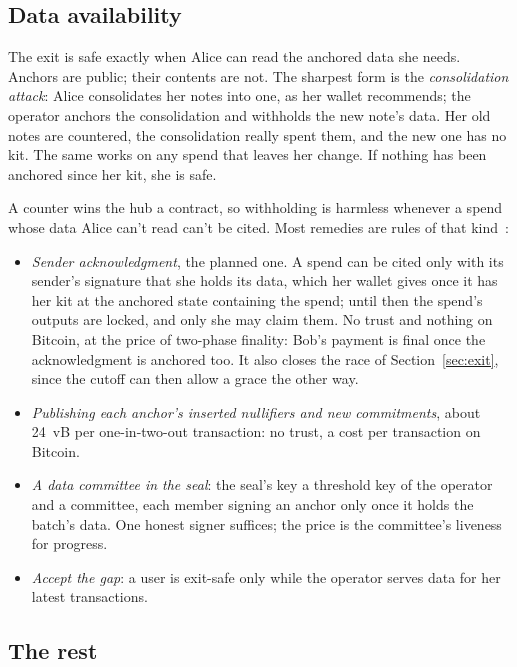 \documentclass[11pt]{article}
\begin{document}
\subsection{Data availability}
\label{sec:da}

The exit is safe exactly when Alice can read the anchored data she
needs. Anchors are public; their contents are not. The sharpest form is
the \emph{consolidation attack}: Alice consolidates her notes into one,
as her wallet recommends; the operator anchors the consolidation and
withholds the new note's data. Her old notes are countered, the
consolidation really spent them, and the new one has no kit. The same
works on any spend that leaves her change. If nothing has been anchored
since her kit, she is safe.

A counter wins the hub a contract, so withholding is harmless whenever a
spend whose data Alice can't read can't be cited. Most remedies are
rules of that kind~\cite{bitcoinrollups}:
\begin{itemize}[leftmargin=1.5em]
\item \emph{Sender acknowledgment}, the planned one. A spend can be cited
  only with its sender's signature that she holds its data, which her
  wallet gives once it has her kit at the anchored state containing the
  spend; until then the spend's outputs are locked, and only she may
  claim them. No trust and nothing on Bitcoin, at the price of
  two-phase finality: Bob's payment is final once the acknowledgment is
  anchored too. It also closes the race of Section~\ref{sec:exit}, since
  the cutoff can then allow a grace the other way.
\item \emph{Publishing each anchor's inserted nullifiers and new
  commitments}, about 24~vB per one-in-two-out transaction: no trust,
  a cost per transaction on Bitcoin.
\item \emph{A data committee in the seal}: the seal's key a threshold key
  of the operator and a committee, each member signing an anchor only
  once it holds the batch's data. One honest signer suffices; the price
  is the committee's liveness for progress.
\item \emph{Accept the gap}: a user is exit-safe only while the operator
  serves data for her latest transactions.
\end{itemize}

\subsection{The rest}
\end{document}
